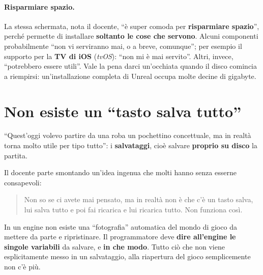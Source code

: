 \paragraph{Risparmiare spazio.} La stessa schermata, nota il docente, ``è super
comoda per \textbf{risparmiare spazio}'', perché permette di installare
\textbf{soltanto le cose che servono}. Alcuni componenti probabilmente ``non vi
serviranno mai, o a breve, comunque''; per esempio il supporto per la
\textbf{TV di iOS} (\emph{tvOS}): ``non mi è mai servito''. Altri, invece,
``potrebbero essere utili''. Vale la pena darci un'occhiata quando il disco
comincia a riempirsi: un'installazione completa di Unreal occupa molte decine
di gigabyte.


\section{Non esiste un ``tasto salva tutto''}
\label{gd16:sec:perche}

``Quest'oggi volevo partire da una roba un pochettino concettuale, ma in realtà
torna molto utile per tipo tutto'': i \textbf{salvataggi}, cioè salvare
\textbf{proprio su disco} la partita.

Il docente parte smontando un'idea ingenua che molti hanno senza esserne
consapevoli:
\begin{quote}
Non so se ci avete mai pensato, ma in realtà non è che c'è un tasto salva, lui
salva tutto e poi fai ricarica e lui ricarica tutto. Non funziona così.
\end{quote}
In un engine non esiste una ``fotografia'' automatica del mondo di gioco da
mettere da parte e ripristinare. Il programmatore deve \textbf{dire
all'engine le singole variabili} da salvare, e \textbf{in che modo}. Tutto ciò
che non viene esplicitamente messo in un salvataggio, alla riapertura del gioco
semplicemente non c'è più.

